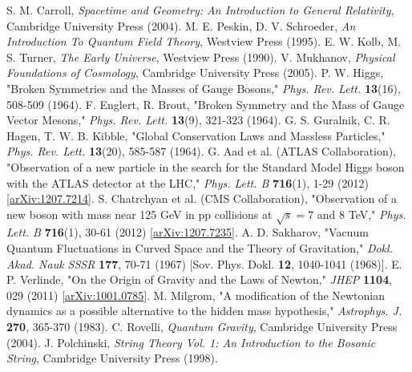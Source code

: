 \documentclass[11pt,a4paper]{article}
\begin{document}
\begin{thebibliography}{99}
 S. M. Carroll, \textit{Spacetime and Geometry: An Introduction to General Relativity}, Cambridge University Press (2004). 
 M. E. Peskin, D. V. Schroeder, \textit{An Introduction To Quantum Field Theory}, Westview Press (1995). 
 E. W. Kolb, M. S. Turner, \textit{The Early Universe}, Westview Press (1990). 
 V. Mukhanov, \textit{Physical Foundations of Cosmology}, Cambridge University Press (2005). 
 P. W. Higgs, "Broken Symmetries and the Masses of Gauge Bosons," \textit{Phys. Rev. Lett.} \textbf{13}(16), 508-509 (1964). 
 F. Englert, R. Brout, "Broken Symmetry and the Mass of Gauge Vector Mesons," \textit{Phys. Rev. Lett.} \textbf{13}(9), 321-323 (1964). 
 G. S. Guralnik, C. R. Hagen, T. W. B. Kibble, "Global Conservation Laws and Massless Particles," \textit{Phys. Rev. Lett.} \textbf{13}(20), 585-587 (1964). 
 G. Aad et al. (ATLAS Collaboration), "Observation of a new particle in the search for the Standard Model Higgs boson with the ATLAS detector at the LHC," \textit{Phys. Lett. B} \textbf{716}(1), 1-29 (2012) [\url{arXiv:1207.7214}]. 
 S. Chatrchyan et al. (CMS Collaboration), "Observation of a new boson with mass near 125 GeV in pp collisions at $\sqrt{s}=7$ and 8 TeV," \textit{Phys. Lett. B} \textbf{716}(1), 30-61 (2012) [\url{arXiv:1207.7235}]. 
 A. D. Sakharov, "Vacuum Quantum Fluctuations in Curved Space and the Theory of Gravitation," \textit{Dokl. Akad. Nauk SSSR} \textbf{177}, 70-71 (1967) [Sov. Phys. Dokl. \textbf{12}, 1040-1041 (1968)]. 
 E. P. Verlinde, "On the Origin of Gravity and the Laws of Newton," \textit{JHEP} \textbf{1104}, 029 (2011) [\url{arXiv:1001.0785}]. 
 M. Milgrom, "A modification of the Newtonian dynamics as a possible alternative to the hidden mass hypothesis," \textit{Astrophys. J.} \textbf{270}, 365-370 (1983). 
 C. Rovelli, \textit{Quantum Gravity}, Cambridge University Press (2004). 
 J. Polchinski, \textit{String Theory Vol. 1: An Introduction to the Bosonic String}, Cambridge University Press (1998). 
\end{thebibliography}
\end{document}
